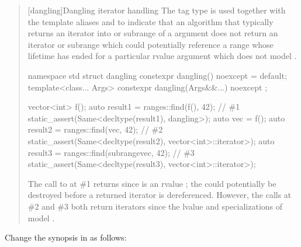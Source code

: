 \begin{quote}
\begin{addedblock}
\setcounter{chapter}{23}
\setcounter{section}{6}
\setcounter{subsection}{3}
[dangling]{Dangling iterator handling}
\pnum
The tag type  is used together with the template aliases
 and  to indicate that
an algorithm that typically returns an iterator into or
subrange of a  argument does not return
an iterator or subrange which could potentially reference a range whose lifetime has ended
for a particular rvalue  argument which
does not model .

\begin{codeblock}
namespace std {
  struct dangling {
    constexpr dangling() noexcept = default;
    template<class... Args>
      constexpr dangling(Args&&...) noexcept { }
  };
}
\end{codeblock}

\pnum
\begin{example}
\begin{codeblock}
vector<int> f();
auto result1 = ranges::find(f(), 42); // \#1
static_assert(Same<decltype(result1), dangling>);
auto vec = f();
auto result2 = ranges::find(vec, 42); // \#2
static_assert(Same<decltype(result2), vector<int>::iterator>);
auto result3 = ranges::find(subrange{vec}, 42); // \#3
static_assert(Same<decltype(result3), vector<int>::iterator>);
\end{codeblock}
The call to  at \#1 returns  since
 is an rvalue ; the  could potentially
be destroyed before a returned iterator is dereferenced. However, the calls
at \#2 and \#3 both return iterators since the lvalue  and
specializations of  model .
\end{example}
\end{addedblock}
\end{quote}

Change the  synopsis in  as follows:

